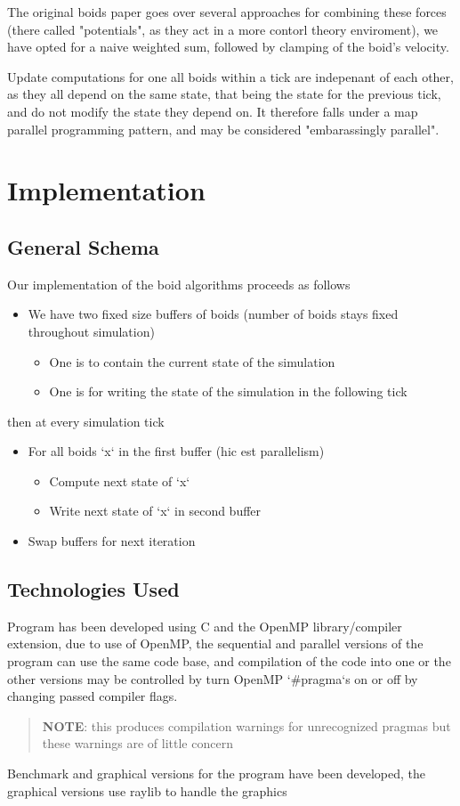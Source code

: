 \documentclass[11pt]{article}
\begin{document}
The original boids paper goes over several approaches for combining these forces (there called "potentials", as they act in a more contorl theory enviroment), we have opted for a naive weighted sum, followed by clamping of the boid's velocity.

Update computations for one all boids within a tick are indepenant of each other, as they all depend on the same state, that being the state for the previous tick, and do not modify the state they depend on.
It therefore falls under a map parallel programming pattern, and may be considered "embarassingly parallel".

\newpage
\section{Implementation}
\label{sec:org4414dc3}
\subsection{General Schema}
\label{sec:orgf4abc52}
Our implementation of the boid algorithms proceeds as follows
\begin{itemize}
\item We have two fixed size buffers of boids (number of boids stays fixed throughout simulation)
\begin{itemize}
\item One is to contain the current state of the simulation
\item One is for writing the state of the simulation in the following tick
\end{itemize}
\end{itemize}
then at every simulation tick
\begin{itemize}
\item For all boids `x` in the first buffer (hic est parallelism)
\begin{itemize}
\item Compute next state of `x`
\item Write next state of `x` in second buffer
\end{itemize}
\item Swap buffers for next iteration
\end{itemize}
\subsection{Technologies Used}
\label{sec:orgeb2abb6}
Program has been developed using C and the OpenMP library/compiler extension, due to use of OpenMP, the sequential and parallel versions of the program can use the same code base, and compilation of the code into one or the other versions may be controlled by turn OpenMP `\#pragma`s on or off by changing passed compiler flags.
\begin{quote}
\textbf{NOTE}: this produces compilation warnings for unrecognized pragmas but these warnings are of little concern
\end{quote}
Benchmark and graphical versions for the program have been developed, the graphical versions use raylib to handle the graphics
\end{document}

